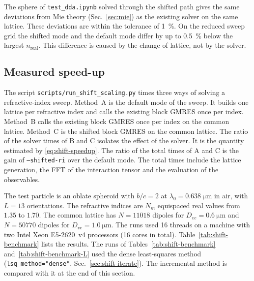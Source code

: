 \documentclass[11pt,a4paper]{article}
\begin{document}
The sphere of \texttt{test\_dda.ipynb} solved through the shifted path
gives the same deviations from Mie theory (Sec.~\ref{sec:mie}) as the
existing solver on the same lattice.
These deviations are within the tolerance of \SI{1}{\percent}.
On the reduced sweep grid the shifted mode and the default mode differ
by up to \SI{0.5}{\percent} below the largest $n_{\mathrm{real}}$.
This difference is caused by the change of lattice, not by the solver.

\subsection{Measured speed-up}
\label{sec:shift-benchmark}

The script \texttt{scripts/run\_shift\_scaling.py} times three ways of
solving a refractive-index sweep.
Method~A is the default mode of the sweep.
It builds one lattice per refractive index and calls the existing block
GMRES once per index.
Method~B calls the existing block GMRES once per index on the common
lattice.
Method~C is the shifted block GMRES on the common lattice.
The ratio of the solver times of B and C isolates the effect of the
solver.
It is the quantity estimated by \eqref{eq:shift-speedup}.
The ratio of the total times of A and C is the gain of
\texttt{--shifted-ri} over the default mode.
The total times include the lattice generation, the FFT of the
interaction tensor and the evaluation of the observables.

The test particle is an oblate spheroid with $b/c = 2$ at
$\lambda_0 = \SI{0.638}{\micro\meter}$ in air, with $L = 13$
orientations.
The refractive indices are $N_m$ equispaced real values from $1.35$ to
$1.70$.
The common lattice has $N = \num{11018}$ dipoles for
$D_{ve} = \SI{0.6}{\micro\meter}$ and $N = \num{50770}$ dipoles for
$D_{ve} = \SI{1.0}{\micro\meter}$.
The runs used 16 threads on a machine with two Intel Xeon E5-2620~v4
processors (16 cores in total).
Table~\ref{tab:shift-benchmark} lists the results.
The runs of Tables~\ref{tab:shift-benchmark}
and~\ref{tab:shift-benchmark-L} used the dense least-squares method
(\texttt{lsq\_method="dense"}, Sec.~\ref{sec:shift-iterate}).
The incremental method is compared with it at the end of this section.
\end{document}
